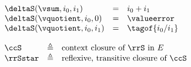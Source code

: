 \begin{flushleft}
\medskip
{}
$\begin{array}{l c l}
  \deltaS(\vsum, i_0, i_1) & = & i_0 + i_1
\\
  \deltaS(\vquotient, i_0, 0) & = & \valueerror
\\
  \deltaS(\vquotient, i_0, i_1) & = & \tagof{i_0 / i_1}
\end{array}$

\medskip
{}
\begin{mathpar}


\end{mathpar}

\medskip
$\begin{array}{l c l}
  \ccS & \triangleq & \mbox{context closure of $\rrS$ in $E$}
\\
  \rrSstar & \triangleq & \mbox{reflexive, transitive closure of $\ccS$}
\end{array}$


\end{flushleft}

